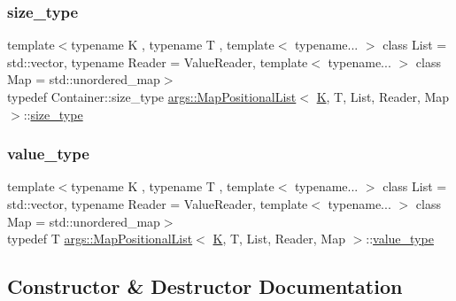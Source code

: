 \subsubsection{\texorpdfstring{size\+\_\+type}{size\_type}}
{\footnotesize\ttfamily template$<$typename K , typename T , template$<$ typename... $>$ class List = std\+::vector, typename Reader  = Value\+Reader, template$<$ typename... $>$ class Map = std\+::unordered\+\_\+map$>$ \\
typedef Container\+::size\+\_\+type \hyperlink{classargs_1_1_map_positional_list}{args\+::\+Map\+Positional\+List}$<$ \hyperlink{cgal__test_8cpp_a891e241aa245ae63618f03737efba309}{K}, T, List, Reader, Map $>$\+::\hyperlink{classargs_1_1_map_positional_list_a217bf984e4c1108f5e4785cef1de1a95}{size\+\_\+type}}

\mbox{\label{classargs_1_1_map_positional_list_aab45440653898824437c3ab443bb4bd7}} 
\subsubsection{\texorpdfstring{value\+\_\+type}{value\_type}}
{\footnotesize\ttfamily template$<$typename K , typename T , template$<$ typename... $>$ class List = std\+::vector, typename Reader  = Value\+Reader, template$<$ typename... $>$ class Map = std\+::unordered\+\_\+map$>$ \\
typedef T \hyperlink{classargs_1_1_map_positional_list}{args\+::\+Map\+Positional\+List}$<$ \hyperlink{cgal__test_8cpp_a891e241aa245ae63618f03737efba309}{K}, T, List, Reader, Map $>$\+::\hyperlink{classargs_1_1_map_positional_list_aab45440653898824437c3ab443bb4bd7}{value\+\_\+type}}



\subsection{Constructor \& Destructor Documentation}
\mbox{\label{classargs_1_1_map_positional_list_ab8dc23a5947d8f10d0e71d907248f52f}} 
